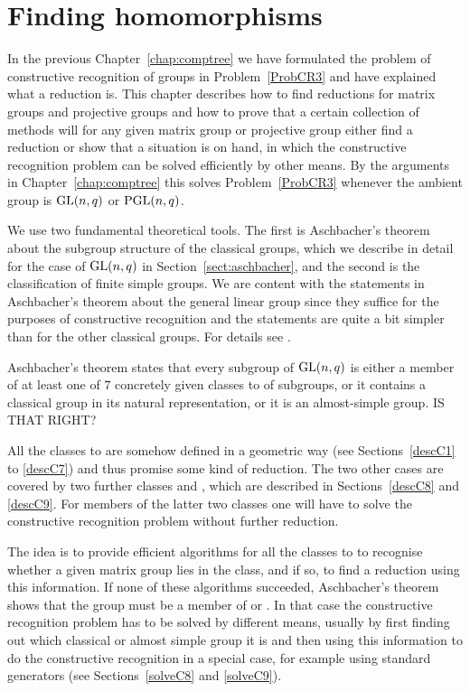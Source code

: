 
\chapter{Finding homomorphisms}
\label{chap:findhom}

In the previous Chapter~\ref{chap:comptree} we have formulated the problem
of constructive recognition of groups in Problem~\ref{ProbCR3} and have
explained what a reduction is. This chapter describes how to find
reductions for matrix groups and projective groups and how to prove
that a certain collection of methods will for any given
matrix group or projective group either find a reduction
or show that a situation is on hand, in which the constructive 
recognition problem can be solved efficiently by other means. By the 
arguments in Chapter~\ref{chap:comptree} this solves
Problem~\ref{ProbCR3} whenever the ambient group is $\GL(n,q)$ or
$\PGL(n,q)$.

We use two fundamental theoretical tools. The first is Aschbacher's theorem
about the subgroup structure of the classical groups, which we describe
in detail for the case of $\GL(n,q)$ in Section~\ref{sect:aschbacher},
and the second is the classification of finite simple groups. We are
content with the statements in Aschbacher's theorem about the general
linear group since they suffice for the purposes of constructive
recognition and the statements are quite a bit simpler than for the
other classical groups. For details see \cite{aschbacher}.

Aschbacher's theorem states that every subgroup of $\GL(n,q)$
is either a member of at least one of $7$ concretely given classes 
 to  of 
subgroups, or it contains a classical group in its natural representation, 
or it is an almost-simple group. IS THAT RIGHT?

All the classes  to  are somehow defined in a geometric way (see
Sections~\ref{descC1} to \ref{descC7}) and thus promise some kind of
reduction. The two other cases are covered by two further classes 
and , which are described in Sections~\ref{descC8} and \ref{descC9}.
For members of the latter two classes one will have to solve the
constructive recognition problem without further reduction.

The idea is to provide efficient algorithms for all the classes  to
 to recognise whether a given matrix group lies in the class, and if
so, to find a reduction using this information. If none of these algorithms
succeeded, Aschbacher's theorem shows that the group must be a member of
 or . In that case the constructive recognition problem has to be
solved by different means, usually by first finding out which classical
or almost simple group it is and then using this information to do the
constructive recognition in a special case, for example using standard
generators (see Sections~\ref{solveC8} and \ref{solveC9}).

